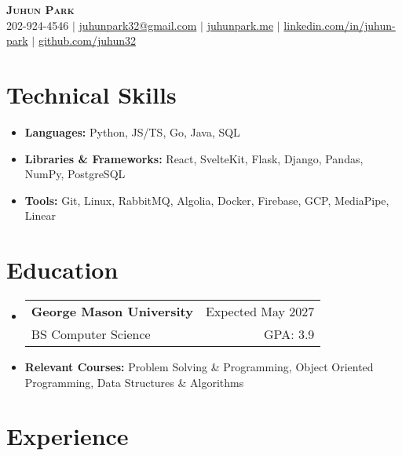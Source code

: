 \documentclass[letterpaper,11pt]{article}
\makeatletter
\newcommand{\resumeItem}[1]{
  \item{
    {#1}
  }
}
\newcommand{\resumeItemThin}[1]{
  \item{
    {#1 \vspace{-5pt}}
  }
}
\newcommand{\resumeSubheading}[4]{
    \item
    \begin{tabular*}{0.985\textwidth}[t]{l@{\extracolsep{\fill}}r@{\hspace{-0.1in}}}
        {\textbf{#1}} & {#2} \\
        #3 &  #4 \\
    \end{tabular*}\vspace{-5pt}
}
\newcommand{\resumeSubHeadingListStart}{\begin{itemize}[leftmargin=0.00in, rightmargin=-0.2in, label={}]\vspace{3pt}}
\newcommand{\resumeSubHeadingListEnd}{\end{itemize}\vspace{-5pt}}
\newcommand{\resumeItemListStart}{\vspace{3pt}\begin{itemize}[leftmargin=0.15in, rightmargin=0.15in]}
\newcommand{\resumeItemListEnd}{\end{itemize}\vspace{-5pt}}
\makeatother
\begin{document}

\begin{center}
  \textbf{\Huge \scshape {Juhun Park}} \\ \vspace{3pt}
   202-924-4546 $|$
  \href{mailto:juhunpark32@gmail.com}{juhunpark32@gmail.com} $|$
  \href{https://www.juhunpark.me/}{juhunpark.me} $|$
  \href{https://linkedin.com/in/juhun-park}{linkedin.com/in/juhun-park} $|$
  \href{https://github.com/juhun32}{github.com/juhun32} \\
\end{center}

\vspace{-10pt}


\section{Technical Skills}
\resumeItemListStart
\resumeItemThin{\textbf{Languages: }{Python, JS/TS, Go, Java, SQL}}\\
\resumeItemThin{\textbf{Libraries \& Frameworks: }{React, SvelteKit, Flask, Django, Pandas, NumPy, PostgreSQL}}\\
\resumeItemThin{\textbf{Tools: }{Git, Linux, RabbitMQ, Algolia, Docker, Firebase, GCP, MediaPipe, Linear}}\\

\resumeItemListEnd


\section{Education}
\resumeSubHeadingListStart
\resumeSubheading
{George Mason University}{Expected May 2027}
{BS Computer Science}{GPA: 3.9}
\resumeItem{\textbf{Relevant Courses: }{Problem Solving \& Programming, Object Oriented Programming, Data Structures \& Algorithms}}
\vspace{-5pt}
\resumeSubHeadingListEnd


\section{Experience}
\end{document}
